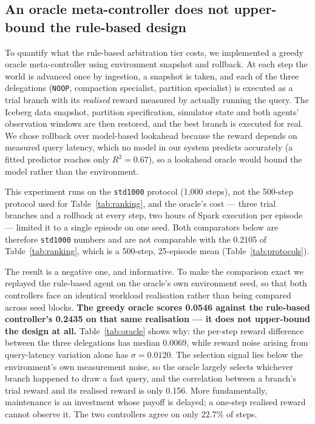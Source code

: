 \documentclass[fleqn,10pt]{wlscirep}
\newcommand{\noop}{\texttt{NOOP}}
\begin{document}
\FloatBarrier

\subsection*{An oracle meta-controller does not upper-bound the rule-based design}
\label{sec:oracle}

To quantify what the rule-based arbitration tier costs, we implemented a
greedy oracle meta-controller using environment snapshot and rollback.
At each step the world is advanced once by ingestion, a snapshot is
taken, and each of the three delegations (\noop{}, compaction
specialist, partition specialist) is executed as a trial branch with its
\emph{realised} reward measured by actually running the query. The
Iceberg data snapshot, partition specification, simulator state and both
agents' observation windows are then restored, and the best branch is
executed for real. We chose rollback over model-based lookahead because
the reward depends on measured query latency, which no model in our
system predicts accurately (a fitted predictor reaches only
$R^2 = 0.67$), so a lookahead oracle would bound the model rather than
the environment.

This experiment runs on the \texttt{std1000} protocol (1{,}000 steps),
not the 500-step protocol used for Table~\ref{tab:ranking}, and the
oracle's cost --- three trial branches and a rollback at every step, two
hours of Spark execution per episode --- limited it to a single episode
on one seed. Both comparators below are therefore \texttt{std1000}
numbers and are not comparable with the 0.2105 of
Table~\ref{tab:ranking}, which is a 500-step, 25-episode mean
(Table~\ref{tab:protocols}).

The result is a negative one, and informative. To make the comparison
exact we replayed the rule-based agent on the oracle's own environment
seed, so that both controllers face an identical workload realisation
rather than being compared across seed blocks.
\textbf{The greedy oracle scores 0.0546 against the rule-based
controller's 0.2435 on that same realisation --- it does not
upper-bound the design at all.} Table~\ref{tab:oracle} shows why: the per-step reward difference between
the three delegations has median 0.0069, while reward noise arising from
query-latency variation alone has $\sigma = 0.0120$. The selection
signal lies below the environment's own measurement noise, so the oracle
largely selects whichever branch happened to draw a fast query, and the
correlation between a branch's trial reward and its realised reward is
only 0.156. More fundamentally, maintenance is an investment whose
payoff is delayed; a one-step realised reward cannot observe it. The two
controllers agree on only 22.7\% of steps.
\end{document}
